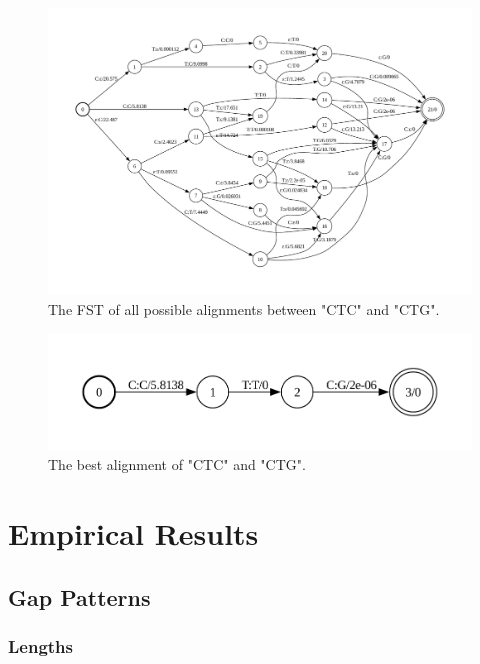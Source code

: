 \documentclass[
]{article}
\begin{document}
\begin{figure}

{\centering \includegraphics{figures/aln-example-graph} 

}

\caption{The FST of all possible alignments between "CTC" and "CTG".}\label{fig:aln-example-a}
\end{figure}

\begin{figure}

{\centering \includegraphics[width=0.75\linewidth]{figures/aln-example-path} 

}

\caption{The best alignment of "CTC" and "CTG".}\label{fig:aln-example-b}
\end{figure}

\newpage

\section{Empirical Results}\label{empirical-results}

\subsection{Gap Patterns}\label{gap-patterns}

\subsubsection{Lengths}\label{lengths}
\end{document}
